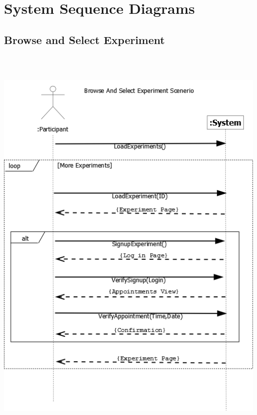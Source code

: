 \section{System Sequence Diagrams}
\subsection{Browse and Select Experiment}
\includegraphics[height=8in]{../other/System-Sequence-diagrams/Browse-experiments.png}
